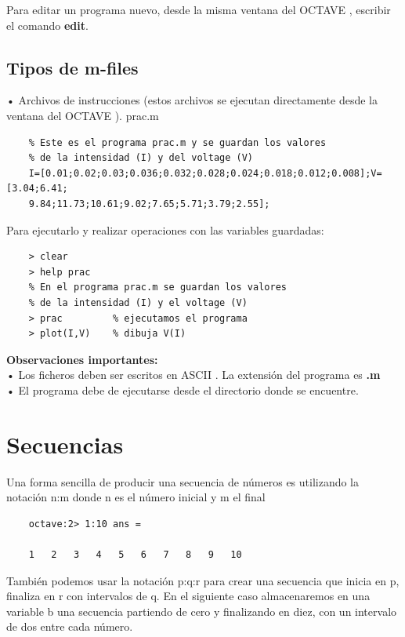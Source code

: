 \documentclass[a4,12pt]{article}
\begin{document}
Para editar un programa nuevo, desde la misma ventana del OCTAVE , escribir el comando \textbf{edit}.

\subsection{Tipos de m-files}

• Archivos de instrucciones (estos archivos se ejecutan directamente desde la ventana del OCTAVE ). prac.m
\begin{verbatim}
    % Este es el programa prac.m y se guardan los valores
    % de la intensidad (I) y del voltage (V)
    I=[0.01;0.02;0.03;0.036;0.032;0.028;0.024;0.018;0.012;0.008];V=[3.04;6.41;
    9.84;11.73;10.61;9.02;7.65;5.71;3.79;2.55];
\end{verbatim}

Para ejecutarlo y realizar operaciones con las variables guardadas:\\
\begin{verbatim}
    > clear
    > help prac
    % En el programa prac.m se guardan los valores
    % de la intensidad (I) y el voltage (V)
    > prac         % ejecutamos el programa
    > plot(I,V)    % dibuja V(I)
\end{verbatim}

\textbf{Observaciones importantes:}\\
• Los ficheros deben ser escritos en ASCII . La extensión del programa es \textbf{.m}\\
• El programa debe de ejecutarse desde el directorio donde se encuentre.\\

\section{Secuencias}

Una forma sencilla de producir una secuencia de números es utilizando la notación n:m
donde n es el número inicial y m el final

\begin{verbatim}
	octave:2> 1:10 ans =

	1	2	3	4	5	6	7	8	9	10
\end{verbatim}

También podemos usar la notación p:q:r para crear una secuencia que inicia en p, finaliza en r con intervalos de q. En el siguiente caso almacenaremos en una variable b una secuencia partiendo de cero y finalizando en diez, con un intervalo de dos entre cada número.
\end{document}
